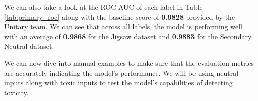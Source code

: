 \begin{table}[ht]
    \centering
    \vspace{5pt}
    \caption{ROC-AUC scores collected from the Primary model using the Primary and Secondary Neutral datasets}
    \label{tab:primary_roc}
\end{table}

We can also take a look at the ROC-AUC of each label in Table \ref{tab:primary_roc} along with the baseline score of \textbf{0.9828} provided by the Unitary team. We can see that across all labels, the model is performing well with an average of \textbf{0.9868} for the Jigsaw dataset and \textbf{0.9883} for the Secondary Neutral dataset.

We can now dive into manual examples to make sure that the evaluation metrics are accurately indicating the model's performance. We will be using neutral inputs along with toxic inputs to test the model's capabilities of detecting toxicity.

